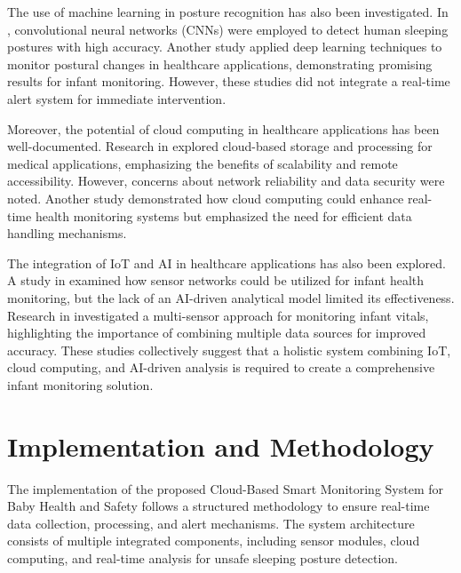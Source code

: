 \documentclass[conference]{IEEEtran}
\begin{document}
The use of machine learning in posture recognition has also been investigated. In \cite{ref4}, convolutional neural networks (CNNs) were employed to detect human sleeping postures with high accuracy. Another study \cite{ref5} applied deep learning techniques to monitor postural changes in healthcare applications, demonstrating promising results for infant monitoring. However, these studies did not integrate a real-time alert system for immediate intervention.

Moreover, the potential of cloud computing in healthcare applications has been well-documented. Research in \cite{ref6} explored cloud-based storage and processing for medical applications, emphasizing the benefits of scalability and remote accessibility. However, concerns about network reliability and data security were noted. Another study \cite{ref7} demonstrated how cloud computing could enhance real-time health monitoring systems but emphasized the need for efficient data handling mechanisms.

The integration of IoT and AI in healthcare applications has also been explored. A study in \cite{ref8} examined how sensor networks could be utilized for infant health monitoring, but the lack of an AI-driven analytical model limited its effectiveness. Research in \cite{ref9} investigated a multi-sensor approach for monitoring infant vitals, highlighting the importance of combining multiple data sources for improved accuracy. These studies collectively suggest that a holistic system combining IoT, cloud computing, and AI-driven analysis is required to create a comprehensive infant monitoring solution.
\section{Implementation and Methodology}
The implementation of the proposed Cloud-Based Smart Monitoring System for Baby Health and Safety follows a structured methodology to ensure real-time data collection, processing, and alert mechanisms. The system architecture consists of multiple integrated components, including sensor modules, cloud computing, and real-time analysis for unsafe sleeping posture detection.
\end{document}
